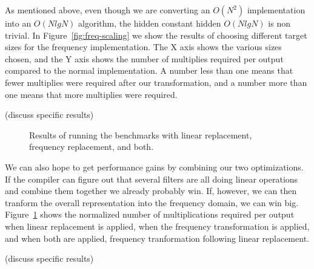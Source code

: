 As mentioned above, even though we are converting an $O(N^2)$ implementation into an
$O(N lg N)$ algorithm, the hidden constant hidden $O(N lg N)$ is non trivial. In
Figure~\ref{fig:freq-scaling} we show the results of choosing different target sizes
for the frequency implementation. The X axis shows the various sizes chosen, and 
the Y axis shows the number of multiplies required per output compared to the normal
implementation. A number less than one means that fewer multiplies were required after
our transformation, and a number more than one means that more multiplies were required.

(discuss specific results)

\begin{figure}
\center
\epsfxsize=3.0in
\caption{Results of running the benchmarks with linear replacement, frequency replacement, and both.}
\label{fig:linear-freq-both}
\end{figure}

We can also hope to get performance gains by combining our two optimizations. 
If the compiler can figure out that several filters are all doing linear operations
and combine them together we already probably win. If, however, we can then tranform
the overall representation into the frequency domain, we can win big. 
Figure~\ref{fig:linear-freq-both} shows the normalized number of multiplications
required per output when linear replacement is applied, when the frequency transformation 
is applied, and when both are applied, frequency tranformation following linear replacement.

(discuss specific results)